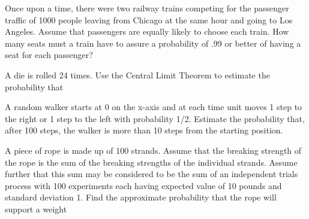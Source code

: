 \documentclass[addpoints,12pt]{exam}
\begin{document}
\begin{questions}
\addpoints

\question[2] Once upon a time, there were two railway trains competing for the passenger
traffic of 1000 people leaving from Chicago at the same hour and going to Los
Angeles. Assume that passengers are equally likely to choose each train. How
many seats must a train have to assure a probability of .99 or better of having
a seat for each passenger?

\vspace{1.5in}

\question[2] A die is rolled 24 times. Use the Central Limit Theorem to estimate the
probability that

\noaddpoints
{}
\addpoints


\question[2] A random walker starts at 0 on the x-axis and at each time unit moves 1
step to the right or 1 step to the left with probability 1/2. Estimate the
probability that, after 100 steps, the walker is more than 10 steps from the
starting position.

\vspace{1.5in}

\question[4] A piece of rope is made up of 100 strands. Assume that the breaking strength
of the rope is the sum of the breaking strengths of the individual strands.
Assume further that this sum may be considered to be the sum of an independent trials process with 100 experiments each having expected value of 10
pounds and standard deviation 1. Find the approximate probability that the
rope will support a weight
\noaddpoints
\begin{parts}

\end{parts}
\end{questions}
\end{document}
